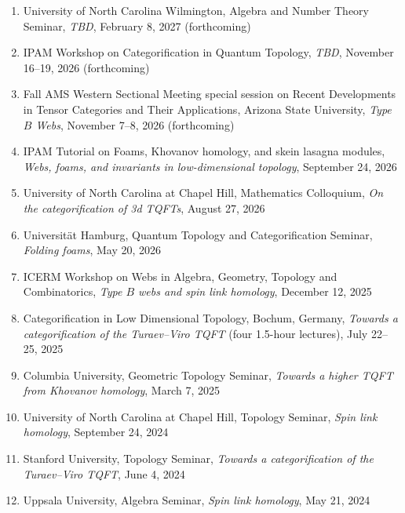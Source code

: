 \documentclass[10pt]{article}
\begin{document}
%
\begin{enumerate}

\item University of North Carolina Wilmington,
Algebra and Number Theory Seminar,
\emph{TBD},
February 8, 2027 (forthcoming)

\item IPAM Workshop on Categorification in Quantum Topology,
\emph{TBD},
November 16--19, 2026 (forthcoming)

\item Fall AMS Western Sectional Meeting 
special session on Recent Developments in Tensor Categories and Their Applications, 
Arizona State University,
\emph{Type $B$ Webs},
November 7--8, 2026 (forthcoming)

\item IPAM Tutorial on Foams, Khovanov homology, and skein lasagna modules,
\emph{Webs, foams, and invariants in low-dimensional topology},
September 24, 2026

\item University of North Carolina at Chapel Hill,
Mathematics Colloquium,
\emph{On the categorification of 3d TQFTs},
August 27, 2026

\item Universit\"{a}t Hamburg, 
Quantum Topology and Categorification Seminar,
\emph{Folding foams},
May 20, 2026

\item ICERM Workshop on Webs in Algebra, Geometry, Topology and Combinatorics, 
\emph{Type $B$ webs and spin link homology},
December 12, 2025

\item Categorification in Low Dimensional Topology,
Bochum, Germany,
\emph{Towards a categorification of the Turaev--Viro TQFT} (four 1.5-hour lectures),
July 22--25, 2025

\item Columbia University, 
Geometric Topology Seminar,
\emph{Towards a higher TQFT from Khovanov homology},
March 7, 2025

\item University of North Carolina at Chapel Hill,
Topology Seminar,
\emph{Spin link homology},
September 24, 2024

\item Stanford University, 
Topology Seminar,
\emph{Towards a categorification of the Turaev--Viro TQFT},
June 4, 2024

\item Uppsala University, 
Algebra Seminar,
\emph{Spin link homology},
May 21, 2024


\end{enumerate}
\end{document}
